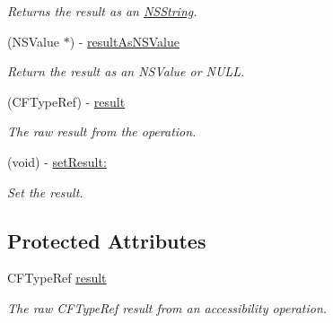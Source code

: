 \begin{DoxyCompactItemize}
\begin{DoxyCompactList}\small\item\em Returns the result as an \hyperlink{class_n_s_string}{NSString}. \item\end{DoxyCompactList}\item 
\hypertarget{interface_g_d_accessibility_operation_result_aeb5c6909f9fcd18a21805dff64dc9e7f}{
(NSValue $\ast$) -\/ \hyperlink{interface_g_d_accessibility_operation_result_aeb5c6909f9fcd18a21805dff64dc9e7f}{resultAsNSValue}}
\label{interface_g_d_accessibility_operation_result_aeb5c6909f9fcd18a21805dff64dc9e7f}

\begin{DoxyCompactList}\small\item\em Return the result as an NSValue or NULL. \item\end{DoxyCompactList}\item 
\hypertarget{interface_g_d_accessibility_operation_result_aa9268222bbab46c715537293324cfb6f}{
(CFTypeRef) -\/ \hyperlink{interface_g_d_accessibility_operation_result_aa9268222bbab46c715537293324cfb6f}{result}}
\label{interface_g_d_accessibility_operation_result_aa9268222bbab46c715537293324cfb6f}

\begin{DoxyCompactList}\small\item\em The raw result from the operation. \item\end{DoxyCompactList}\item 
(void) -\/ \hyperlink{interface_g_d_accessibility_operation_result_abc0beacffc69b1116f6a332b26b0aeb8}{setResult:}
\begin{DoxyCompactList}\small\item\em Set the result. \item\end{DoxyCompactList}\end{DoxyCompactItemize}
\subsection*{Protected Attributes}
\begin{DoxyCompactItemize}
\item 
\hypertarget{interface_g_d_accessibility_operation_result_af1c57b003612db6ad1ccebd5b956cf3b}{
CFTypeRef \hyperlink{interface_g_d_accessibility_operation_result_af1c57b003612db6ad1ccebd5b956cf3b}{result}}
\label{interface_g_d_accessibility_operation_result_af1c57b003612db6ad1ccebd5b956cf3b}

\begin{DoxyCompactList}\small\item\em The raw CFTypeRef result from an accessibility operation. \item\end{DoxyCompactList}\end{DoxyCompactItemize}

